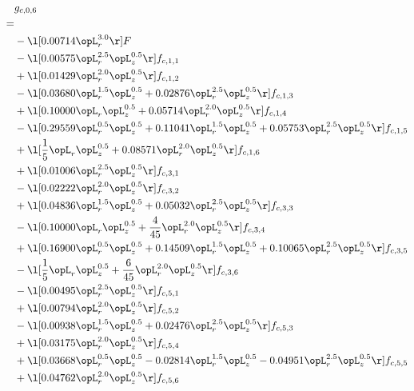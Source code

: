 \begin{alignat}{2} 
\label{eq:g_06_0} 
& g_{c,0,6} \nonumber \\ 
 = \\ 
& - \l[  0.00714 \opL_r^{3.0}  \r] F \nonumber \\ 
& - \l[  0.00575 \opL_r^{2.5} \opL_z^{0.5}  \r] f_{c,1,1} \nonumber \\ 
& + \l[  0.01429 \opL_r^{2.0} \opL_z^{0.5}  \r] f_{c,1,2} \nonumber \\ 
& - \l[  0.03680 \opL_r^{1.5} \opL_z^{0.5} +  0.02876 \opL_r^{2.5} \opL_z^{0.5}  \r] f_{c,1,3} \nonumber \\ 
& + \l[  0.10000 \opL_r \opL_z^{0.5} +  0.05714 \opL_r^{2.0} \opL_z^{0.5}  \r] f_{c,1,4} \nonumber \\ 
& - \l[  0.29559 \opL_r^{0.5} \opL_z^{0.5} +  0.11041 \opL_r^{1.5} \opL_z^{0.5} +  0.05753 \opL_r^{2.5} \opL_z^{0.5}  \r] f_{c,1,5} \nonumber \\ 
& + \l[ \frac{1}{5} \opL_r \opL_z^{0.5} +  0.08571 \opL_r^{2.0} \opL_z^{0.5}  \r] f_{c,1,6} \nonumber \\ 
& + \l[  0.01006 \opL_r^{2.5} \opL_z^{0.5}  \r] f_{c,3,1} \nonumber \\ 
& - \l[  0.02222 \opL_r^{2.0} \opL_z^{0.5}  \r] f_{c,3,2} \nonumber \\ 
& + \l[  0.04836 \opL_r^{1.5} \opL_z^{0.5} +  0.05032 \opL_r^{2.5} \opL_z^{0.5}  \r] f_{c,3,3} \nonumber \\ 
& - \l[  0.10000 \opL_r \opL_z^{0.5} + \frac{4}{45} \opL_r^{2.0} \opL_z^{0.5}  \r] f_{c,3,4} \nonumber \\ 
& + \l[  0.16900 \opL_r^{0.5} \opL_z^{0.5} +  0.14509 \opL_r^{1.5} \opL_z^{0.5} +  0.10065 \opL_r^{2.5} \opL_z^{0.5}  \r] f_{c,3,5} \nonumber \\ 
& - \l[ \frac{1}{5} \opL_r \opL_z^{0.5} + \frac{6}{45} \opL_r^{2.0} \opL_z^{0.5}  \r] f_{c,3,6} \nonumber \\ 
& - \l[  0.00495 \opL_r^{2.5} \opL_z^{0.5}  \r] f_{c,5,1} \nonumber \\ 
& + \l[  0.00794 \opL_r^{2.0} \opL_z^{0.5}  \r] f_{c,5,2} \nonumber \\ 
& - \l[  0.00938 \opL_r^{1.5} \opL_z^{0.5} +  0.02476 \opL_r^{2.5} \opL_z^{0.5}  \r] f_{c,5,3} \nonumber \\ 
& + \l[  0.03175 \opL_r^{2.0} \opL_z^{0.5}  \r] f_{c,5,4} \nonumber \\ 
& + \l[  0.03668 \opL_r^{0.5} \opL_z^{0.5}   -0.02814 \opL_r^{1.5} \opL_z^{0.5}   -0.04951 \opL_r^{2.5} \opL_z^{0.5}  \r] f_{c,5,5} \nonumber \\ 
& + \l[  0.04762 \opL_r^{2.0} \opL_z^{0.5}  \r] f_{c,5,6} \nonumber \\ 
\end{alignat} 


